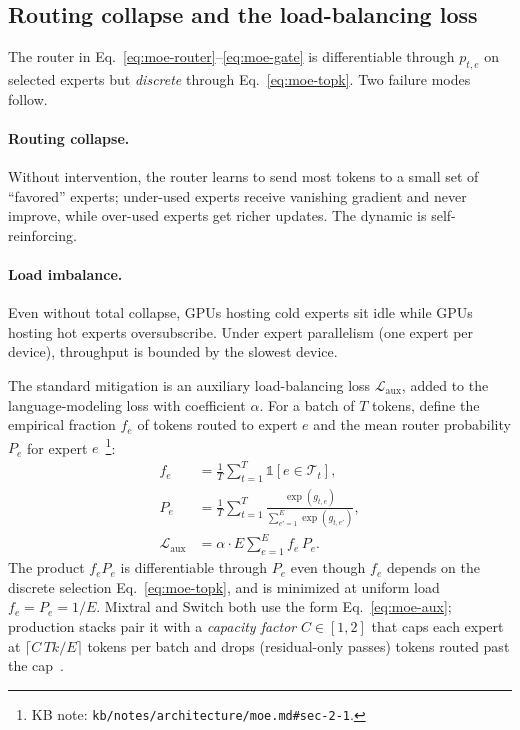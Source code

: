 \subsection{Routing collapse and the load-balancing loss}
\label{sec:ffn-load-balance}

The router in Eq.~\eqref{eq:moe-router}--\eqref{eq:moe-gate} is
differentiable through $p_{t,e}$ on selected experts but
\emph{discrete} through Eq.~\eqref{eq:moe-topk}. Two failure modes
follow.

\paragraph{Routing collapse.}
Without intervention, the router learns to send most tokens to a small
set of ``favored'' experts; under-used experts receive vanishing
gradient and never improve, while over-used experts get richer
updates. The dynamic is self-reinforcing.

\paragraph{Load imbalance.}
Even without total collapse, GPUs hosting cold experts sit idle while
GPUs hosting hot experts oversubscribe. Under expert parallelism
(one expert per device), throughput is bounded by the slowest device.

The standard mitigation is an auxiliary load-balancing loss
$\mathcal{L}_{\text{aux}}$, added to the language-modeling loss with
coefficient $\alpha$. For a batch of $T$ tokens, define the empirical
fraction $f_e$ of tokens routed to expert $e$ and the mean router
probability $P_e$ for expert
$e$~\citep[\S 2.2]{fedus2021-switch}\footnote{KB note:
\nolinkurl{kb/notes/architecture/moe.md#sec-2-1}. }:
\begin{align}
  f_e &= \frac{1}{T} \sum_{t=1}^T \mathbb{1}\!\left[e \in \mathcal{T}_t\right], \label{eq:moe-fe} \\
  P_e &= \frac{1}{T} \sum_{t=1}^T \frac{\exp(g_{t,e})}{\sum_{e'=1}^E \exp(g_{t,e'})}, \label{eq:moe-pe} \\
  \mathcal{L}_{\text{aux}} &= \alpha \cdot E \sum_{e=1}^{E} f_e\, P_e. \label{eq:moe-aux}
\end{align}
The product $f_e P_e$ is differentiable through $P_e$ even though
$f_e$ depends on the discrete selection
Eq.~\eqref{eq:moe-topk}, and is minimized at uniform load
$f_e = P_e = 1/E$. Mixtral and Switch both use the form
Eq.~\eqref{eq:moe-aux}; production stacks pair it with a
\emph{capacity factor} $C \in [1, 2]$ that caps each expert at
$\lceil C\,T k / E \rceil$ tokens per batch and drops (residual-only
passes) tokens routed past the
cap~\citep[\S 2.3]{fedus2021-switch}.

